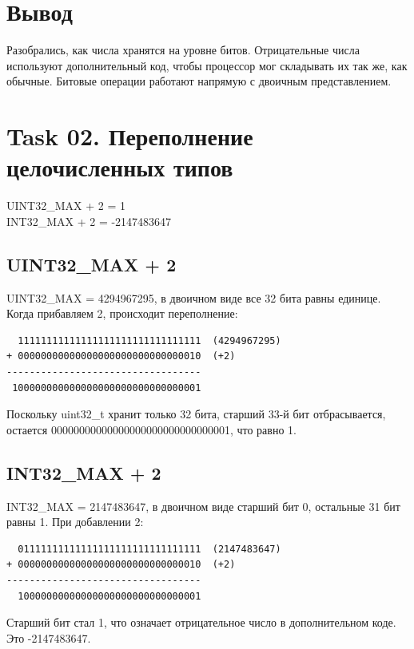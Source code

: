 \documentclass[12pt,a4paper]{article}
\begin{document}
    \section*{Вывод}

    Разобрались, как числа хранятся на уровне битов. Отрицательные числа используют дополнительный код, чтобы процессор мог складывать их так же, как обычные. Битовые операции работают напрямую с двоичным представлением.

    \section*{Task 02. Переполнение целочисленных типов}

    UINT32\_MAX + 2 = 1 \\
    INT32\_MAX + 2 = -2147483647

    \subsection*{UINT32\_MAX + 2}

    UINT32\_MAX = 4294967295, в двоичном виде все 32 бита равны единице. Когда прибавляем 2, происходит переполнение:

    \begin{verbatim}
  11111111111111111111111111111111  (4294967295)
+ 00000000000000000000000000000010  (+2)
----------------------------------
 100000000000000000000000000000001
    \end{verbatim}

    Поскольку uint32\_t хранит только 32 бита, старший 33-й бит отбрасывается, остается 00000000000000000000000000000001, что равно 1.

    \subsection*{INT32\_MAX + 2}

    INT32\_MAX = 2147483647, в двоичном виде старший бит 0, остальные 31 бит равны 1. При добавлении 2:

    \begin{verbatim}
  01111111111111111111111111111111  (2147483647)
+ 00000000000000000000000000000010  (+2)
----------------------------------
  10000000000000000000000000000001
    \end{verbatim}

    Старший бит стал 1, что означает отрицательное число в дополнительном коде. Это -2147483647.
\end{document}
